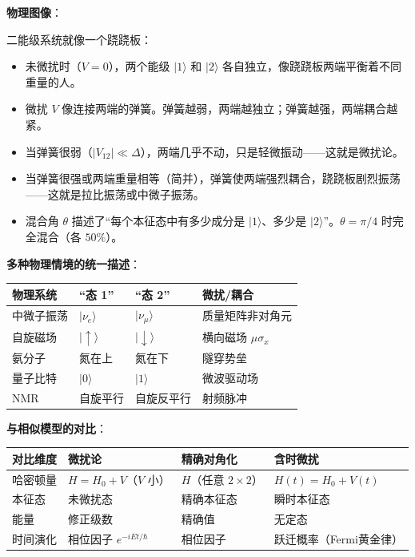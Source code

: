 \begin{insightbox}[物理图像与模型关联]
\textbf{物理图像}：

二能级系统就像一个跷跷板：
\begin{itemize}[nosep]
    \item 未微扰时（$V=0$），两个能级 $|1\rangle$ 和 $|2\rangle$ 各自独立，像跷跷板两端平衡着不同重量的人。
    \item 微扰 $V$ 像连接两端的弹簧。弹簧越弱，两端越独立；弹簧越强，两端耦合越紧。
    \item 当弹簧很弱（$|V_{12}|\ll\Delta$），两端几乎不动，只是轻微振动——这就是微扰论。
    \item 当弹簧很强或两端重量相等（简并），弹簧使两端强烈耦合，跷跷板剧烈振荡——这就是拉比振荡或中微子振荡。
    \item 混合角 $\theta$ 描述了``每个本征态中有多少成分是 $|1\rangle$、多少是 $|2\rangle$''。$\theta=\pi/4$ 时完全混合（各 $50\%$）。
\end{itemize}

\textbf{多种物理情境的统一描述}：
\begin{center}
\begin{tabular}{llll}
\toprule
\textbf{物理系统} & \textbf{``态 1''} & \textbf{``态 2''} & \textbf{微扰/耦合} \\
\midrule
中微子振荡 & $|\nu_e\rangle$ & $|\nu_\mu\rangle$ & 质量矩阵非对角元 \\
自旋磁场 & $|\uparrow\rangle$ & $|\downarrow\rangle$ & 横向磁场 $\mu\sigma_x$ \\
氨分子 & 氮在上 & 氮在下 & 隧穿势垒 \\
量子比特 & $|0\rangle$ & $|1\rangle$ & 微波驱动场 \\
NMR & 自旋平行 & 自旋反平行 & 射频脉冲 \\
\bottomrule
\end{tabular}
\end{center}

\textbf{与相似模型的对比}：
\begin{center}
\begin{tabular}{llll}
\toprule
\textbf{对比维度} & \textbf{微扰论} & \textbf{精确对角化} & \textbf{含时微扰} \\
\midrule
哈密顿量 & $H=H_0+V$（$V$ 小） & $H$（任意 $2\times2$） & $H(t)=H_0+V(t)$ \\
本征态 & 未微扰态 & 精确本征态 & 瞬时本征态 \\
能量 & 修正级数 & 精确值 & 无定态 \\
时间演化 & 相位因子 $e^{-iEt/\hbar}$ & 相位因子 & 跃迁概率（Fermi黄金律） \\
\bottomrule
\end{tabular}
\end{center}


\end{insightbox}
